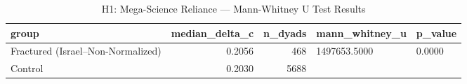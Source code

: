 \begin{table}
\caption{H1: Mega-Science Reliance — Mann-Whitney U Test Results}
\label{tab:h1_mann_whitney}
\begin{tabular}{lrrll}
\toprule
group & median\_delta\_c & n\_dyads & mann\_whitney\_u & p\_value \\
\midrule
Fractured (Israel–Non-Normalized) & 0.2056 & 468 & 1497653.5000 & 0.0000 \\
Control & 0.2030 & 5688 &  &  \\
\bottomrule
\end{tabular}
\end{table}
